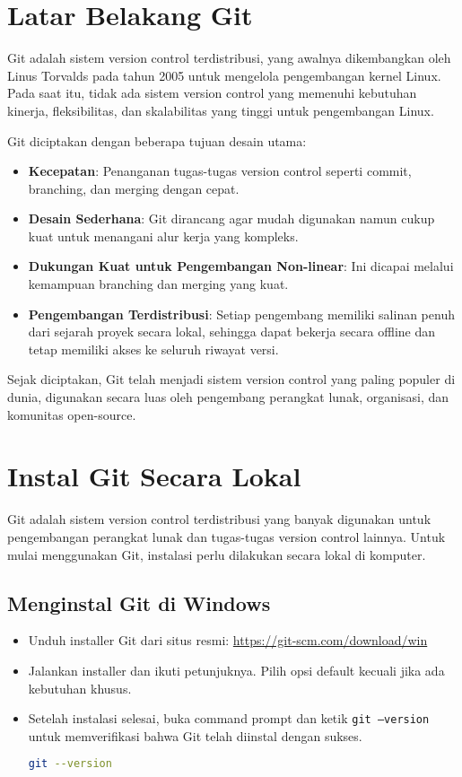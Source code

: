 \section{Latar Belakang Git}
Git adalah sistem version control terdistribusi, yang awalnya dikembangkan oleh Linus Torvalds pada tahun 2005 untuk mengelola pengembangan kernel Linux. Pada saat itu, tidak ada sistem version control yang memenuhi kebutuhan kinerja, fleksibilitas, dan skalabilitas yang tinggi untuk pengembangan Linux.

Git diciptakan dengan beberapa tujuan desain utama:
\begin{itemize}
	\item \textbf{Kecepatan}: Penanganan tugas-tugas version control seperti commit, branching, dan merging dengan cepat.
	\item \textbf{Desain Sederhana}: Git dirancang agar mudah digunakan namun cukup kuat untuk menangani alur kerja yang kompleks.
	\item \textbf{Dukungan Kuat untuk Pengembangan Non-linear}: Ini dicapai melalui kemampuan branching dan merging yang kuat.
	\item \textbf{Pengembangan Terdistribusi}: Setiap pengembang memiliki salinan penuh dari sejarah proyek secara lokal, sehingga dapat bekerja secara offline dan tetap memiliki akses ke seluruh riwayat versi.
\end{itemize}

Sejak diciptakan, Git telah menjadi sistem version control yang paling populer di dunia, digunakan secara luas oleh pengembang perangkat lunak, organisasi, dan komunitas open-source.

\section{Instal Git Secara Lokal}
Git adalah sistem version control terdistribusi yang banyak digunakan untuk pengembangan perangkat lunak dan tugas-tugas version control lainnya. Untuk mulai menggunakan Git, instalasi perlu dilakukan secara lokal di komputer.

\subsection{Menginstal Git di Windows}
\begin{itemize}
	\item Unduh installer Git dari situs resmi: \url{https://git-scm.com/download/win}
	\item Jalankan installer dan ikuti petunjuknya. Pilih opsi default kecuali jika ada kebutuhan khusus.
	\item Setelah instalasi selesai, buka command prompt dan ketik \texttt{git --version} untuk memverifikasi bahwa Git telah diinstal dengan sukses.
	\begin{lstlisting}[language=bash]
		git --version
	\end{lstlisting}
\end{itemize}

